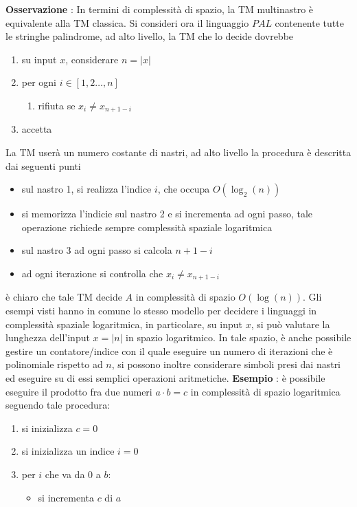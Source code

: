 \documentclass[10pt, letterpaper]{report}
\begin{document}
\textbf{Osservazione} : In termini di complessità di spazio, la TM multinastro è equivalente alla TM classica.\acc 
Si consideri ora il linguaggio $PAL$ contenente tutte le stringhe palindrome, ad alto livello, la TM che lo decide dovrebbe\begin{enumerate}
    \item su input $x$, considerare $n=|x|$
    \item per ogni $i\in[1,2 \dots , n]$\begin{enumerate}
        \item rifiuta se $x_i\ne x_{n+1-i}$
    \end{enumerate}
    \item accetta
\end{enumerate}
La TM userà un numero costante di nastri, ad alto livello la procedura è descritta dai seguenti punti\begin{itemize}
    \item sul nastro 1, si realizza l'indice $i$, che occupa $O(\log_2(n))$
    \item si memorizza l'indicie sul nastro 2 e si incrementa ad ogni passo, tale operazione richiede sempre complessità spaziale logaritmica 
    \item sul nastro 3 ad ogni passo si calcola $n+1-i$
    \item ad ogni iterazione si controlla che $x_i\ne x_{n+1-i}$
\end{itemize}
è chiaro che tale TM decide $A$ in complessità di spazio $O(\log(n))$.\acc 
Gli esempi visti hanno in comune lo stesso modello per decidere i linguaggi in complessità spaziale logaritmica, in particolare, su input $x$, si può valutare la lunghezza dell'input $x=|n|$ in spazio logaritmico. \acc 
In tale spazio, è anche possibile gestire un contatore/indice con il quale eseguire un numero di iterazioni che è polinomiale rispetto ad $n$, si possono inoltre considerare simboli presi dai nastri ed eseguire su di essi semplici operazioni aritmetiche.\acc 
\textbf{Esempio} : è possibile eseguire il prodotto fra due numeri $a\cdot b = c$ in complessità di spazio logaritmica seguendo tale procedura:\begin{enumerate}
    \item si inizializza $c=0$
    \item si inizializza un indice $i=0$
    \item per $i$ che va da $0$ a $b$:\begin{itemize}
        \item si incrementa  $c$ di $a$
    \end{itemize}
\end{enumerate}
\end{document}
